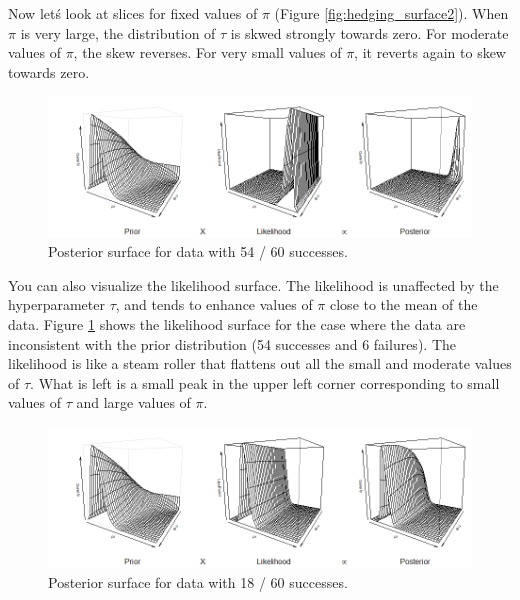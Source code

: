 \documentclass[12pt]{article}
\begin{document}
Now let\'s look at slices for fixed values of $\pi$ (Figure \ref{fig:hedging_surface2}). When $\pi$ is very large, the distribution of $\tau$ is skwed strongly towards zero. For moderate values of $\pi$, the skew reverses. For very small values of $\pi$, it reverts again to skew towards zero.

\begin{figure}
\begin{center}
\includegraphics[width=6.25in]{fig6.png}
\end{center}
\caption{Posterior surface for data with 54 / 60 successes. \label{fig:hedging_surface3}}
\end{figure}

You can also visualize the likelihood surface. The likelihood is unaffected by the hyperparameter $\tau$, and tends to enhance values of $\pi$ close to the mean of the data. Figure \ref{fig:hedging_surface3} shows the likelihood surface for the case where the data are inconsistent with the prior distribution (54 successes and 6 failures). The likelihood is like a steam roller that flattens out all the small and moderate values of $\tau$. What is left is a small peak in the upper left corner corresponding to small values of $\tau$ and large values of $\pi$.

\begin{figure}
\begin{center}
\includegraphics[width=6.25in]{fig7.png}
\end{center}
\caption{Posterior surface for data with 18 / 60 successes. \label{fig:hedging_surface4}}
\end{figure}
\end{document}
